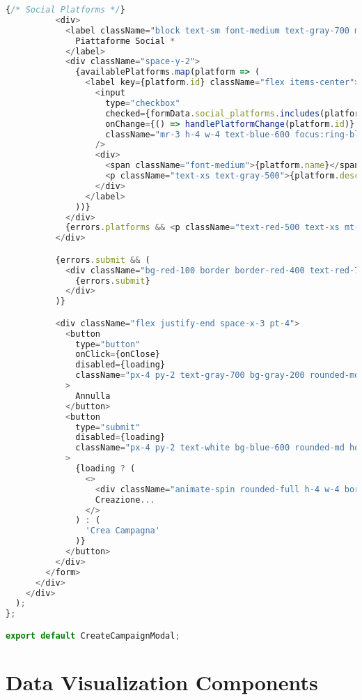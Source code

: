 \documentclass[12pt,a4paper]{report}
\begin{document}
\begin{lstlisting}[language=JavaScript, caption=CreateCampaignModal.jsx]
          {/* Social Platforms */}
          <div>
            <label className="block text-sm font-medium text-gray-700 mb-2">
              Piattaforme Social *
            </label>
            <div className="space-y-2">
              {availablePlatforms.map(platform => (
                <label key={platform.id} className="flex items-center">
                  <input
                    type="checkbox"
                    checked={formData.social_platforms.includes(platform.id)}
                    onChange={() => handlePlatformChange(platform.id)}
                    className="mr-3 h-4 w-4 text-blue-600 focus:ring-blue-500 border-gray-300 rounded"
                  />
                  <div>
                    <span className="font-medium">{platform.name}</span>
                    <p className="text-xs text-gray-500">{platform.description}</p>
                  </div>
                </label>
              ))}
            </div>
            {errors.platforms && <p className="text-red-500 text-xs mt-1">{errors.platforms}</p>}
          </div>

          {errors.submit && (
            <div className="bg-red-100 border border-red-400 text-red-700 px-4 py-3 rounded">
              {errors.submit}
            </div>
          )}

          <div className="flex justify-end space-x-3 pt-4">
            <button
              type="button"
              onClick={onClose}
              disabled={loading}
              className="px-4 py-2 text-gray-700 bg-gray-200 rounded-md hover:bg-gray-300 disabled:opacity-50"
            >
              Annulla
            </button>
            <button
              type="submit"
              disabled={loading}
              className="px-4 py-2 text-white bg-blue-600 rounded-md hover:bg-blue-700 disabled:opacity-50 flex items-center"
            >
              {loading ? (
                <>
                  <div className="animate-spin rounded-full h-4 w-4 border-b-2 border-white mr-2"></div>
                  Creazione...
                </>
              ) : (
                'Crea Campagna'
              )}
            </button>
          </div>
        </form>
      </div>
    </div>
  );
};

export default CreateCampaignModal;
\end{lstlisting}

\section{Data Visualization Components}
\end{document}
